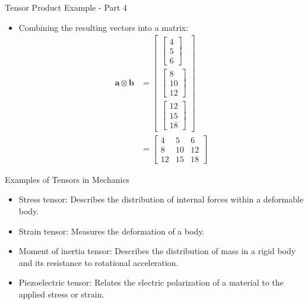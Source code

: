 \documentclass{beamer}
\begin{document}
\begin{frame}{Tensor Product Example - Part 4}
\begin{itemize}
\item Combining the resulting vectors into a matrix:
\begin{align*}
\mathbf{a} \otimes \mathbf{b} &= \begin{bmatrix} \begin{bmatrix} 4 \\ 5 \\ 6 \end{bmatrix} \\ \begin{bmatrix} 8 \\ 10 \\ 12 \end{bmatrix} \\ \begin{bmatrix} 12 \\ 15 \\ 18 \end{bmatrix} \end{bmatrix} \\
&= \begin{bmatrix} 4 & 5 & 6 \\ 8 & 10 & 12 \\ 12 & 15 & 18 \end{bmatrix}
\end{align*}
\end{itemize}
\end{frame}

\begin{frame}{Examples of Tensors in Mechanics}
    \begin{itemize}
        \item Stress tensor: Describes the distribution of internal forces within a deformable body.
        \item Strain tensor: Measures the deformation of a body.
        \item Moment of inertia tensor: Describes the distribution of mass in a rigid body and its resistance to rotational acceleration.
        \item Piezoelectric tensor: Relates the electric polarization of a material to the applied stress or strain.
    \end{itemize}
\end{frame}
\end{document}
